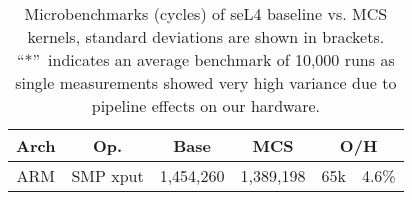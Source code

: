 \begin{table}[t]\centering
\begin{tabular}{|c|l| r@{~}l | r@{~}l |r@{~}r|}\hline
\textbf{Arch}           & \multicolumn{1}{c|}{\textbf{Op.}}
                                & \multicolumn{2}{c|}{\textbf{Base}}
                                & \multicolumn{2}{c|}{\textbf{MCS}}
                                & \multicolumn{2}{c|}{\textbf{O/H}} \\ \hline
\multirow{5}{*}{ARM}

\hline
\multirow{6}{*}{x64}

& SMP xput & \multicolumn{2}{l|}{1,454,260} & \multicolumn{2}{l|}{1,389,198} & 65k & 4.6\% \\
\hline
\end{tabular}
\caption{Microbenchmarks (cycles) of seL4 baseline vs. MCS kernels,
  standard deviations are shown in brackets. ``*''~indicates an
  average benchmark of 10,000 runs as single measurements showed very
  high variance due to pipeline effects on our hardware.}
\label{t:micro}
\end{table}
